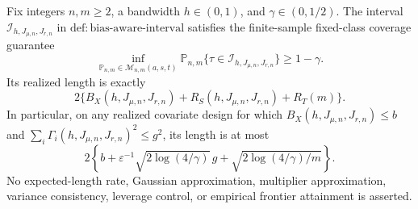 Fix integers \(n,m\ge2\), a bandwidth \(h\in(0,1)\), and \(\gamma\in(0,1/2)\). The interval \(\mathcal I_{h,J_{\mu,n},J_{r,n}}\) in \(\mathrm{def:bias\text{-}aware\text{-}interval}\) satisfies the finite-sample fixed-class coverage guarantee
\[
\inf_{\mathbb P_{n,m}\in\mathcal M_{n,m}(a,s,t)}
\mathbb P_{n,m}\{\tau\in\mathcal I_{h,J_{\mu,n},J_{r,n}}\}\ge1-\gamma.
\]
Its realized length is exactly
\[
2\{B_X(h,J_{\mu,n},J_{r,n})+R_S(h,J_{\mu,n},J_{r,n})+R_T(m)\}.
\]
In particular, on any realized covariate design for which \(B_X(h,J_{\mu,n},J_{r,n})\le b\) and \(\sum_i\Gamma_i(h,J_{\mu,n},J_{r,n})^2\le g^2\), its length is at most
\[
2\left\{b+\varepsilon^{-1}\sqrt{2\log(4/\gamma)}\,g+\sqrt{2\log(4/\gamma)/m}\right\}.
\]
No expected-length rate, Gaussian approximation, multiplier approximation, variance consistency, leverage control, or empirical frontier attainment is asserted.